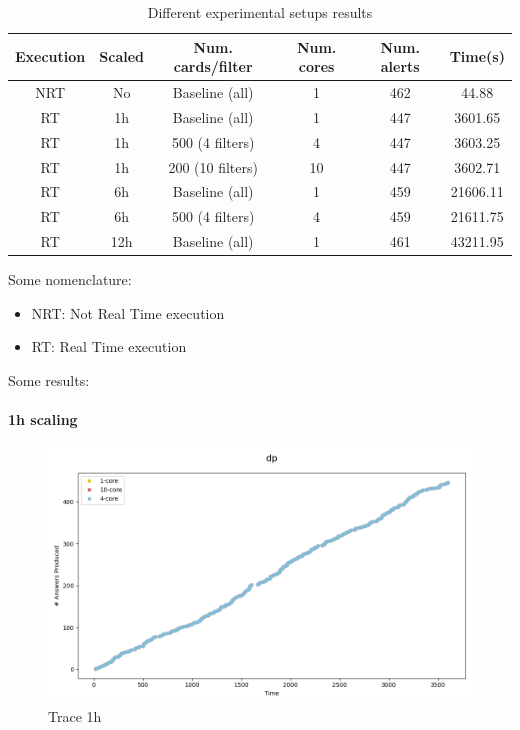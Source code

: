 \begin{table}[H]
\centering
\begin{tabular}{|c|c|c|c|c|c|}
  \hline
  Execution & Scaled   & Num. cards/filter& Num. cores & Num. alerts & Time(s) \\ \hline
  NRT & No & Baseline (all) & 1 & 462 & 44.88 \\ \hline
  RT  & 1h & Baseline (all) & 1 & 447 & 3601.65\\ \hline
  RT  & 1h & 500 (4 filters) & 4 & 447 & 3603.25\\ \hline
  RT  & 1h & 200 (10 filters) & 10 & 447 & 3602.71\\ \hline
  RT  & 6h & Baseline (all) & 1 & 459 & 21606.11 \\ \hline
  RT  & 6h & 500 (4 filters) & 4 & 459 & 21611.75 \\ \hline
  RT  & 12h & Baseline (all) & 1 & 461 & 43211.95 \\ \hline
\end{tabular}
\caption{Different experimental setups results}
\label{table:small-results}
\end{table}

Some nomenclature:
\begin{itemize}
  \item NRT: Not Real Time execution
  \item RT: Real Time execution
\end{itemize}

Some results:

\paragraph{1h scaling\\}



\begin{figure}[H]
  \centering
  \includegraphics[scale = 0.5]{images/4-Experiments/traces-1h.png}
  \caption{Trace 1h}
\end{figure}

